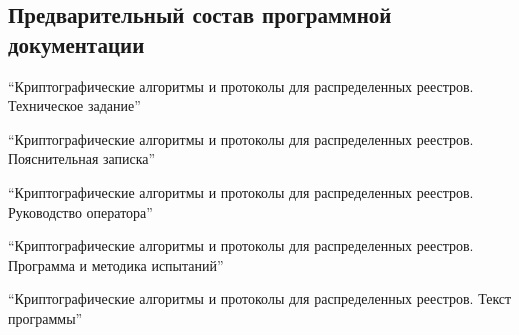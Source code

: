 \subsection{Предварительный состав программной документации}\label{docs}
\begin{my_enumerate}
    \item ``Криптографические алгоритмы и протоколы для распределенных реестров. Техническое 
    задание''
    \item ``Криптографические алгоритмы и протоколы для распределенных реестров. 
    Пояснительная записка''
    \item ``Криптографические алгоритмы и протоколы для распределенных реестров. 
    Руководство оператора''
    \item ``Криптографические алгоритмы и протоколы для распределенных реестров. Программа и 
    методика испытаний''
    \item ``Криптографические алгоритмы и протоколы для распределенных реестров. Текст 
    программы''
\end{my_enumerate}

